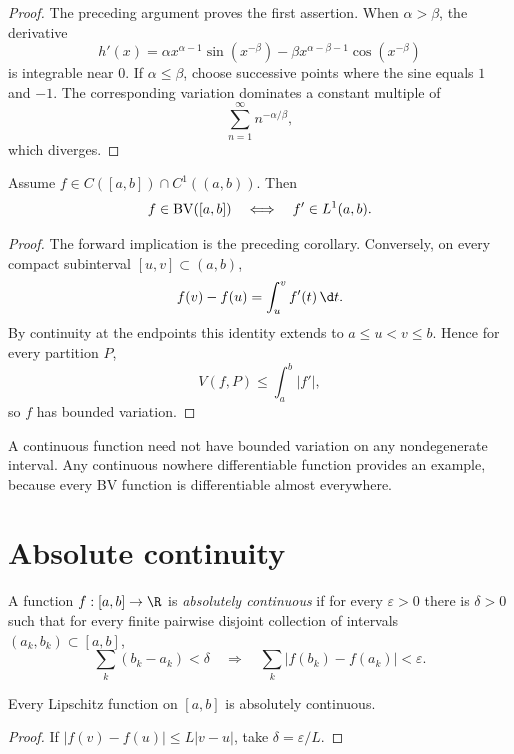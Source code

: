 \begin{proof}
The preceding argument proves the first assertion. When $\alpha>\beta$, the derivative
\[
h'(x)=\alpha x^{\alpha-1}\sin(x^{-\beta})
      -\beta x^{\alpha-\beta-1}\cos(x^{-\beta})
\]
is integrable near $0$. If $\alpha\leq\beta$, choose successive points where the sine equals $1$ and $-1$. The corresponding variation dominates a constant multiple of
\[
\sum_{n=1}^{\infty}n^{-\alpha/\beta},
\]
which diverges.
\end{proof}

\begin{prop}
Assume $f\in C([a,b])\cap C^1((a,b))$. Then
\[
f\in\operatorname{BV}([a,b])\quad\Longleftrightarrow\quad f'\in L^1(a,b).
\]
\end{prop}

\begin{proof}
The forward implication is the preceding corollary. Conversely, on every compact subinterval $[u,v]\subset(a,b)$,
\[
f(v)-f(u)=\int_u^v f'(t)\,\d t.
\]
By continuity at the endpoints this identity extends to $a\leq u<v\leq b$. Hence for every partition $P$,
\[
V(f,P)\leq\int_a^b|f'|,
\]
so $f$ has bounded variation.
\end{proof}

\begin{remark}
A continuous function need not have bounded variation on any nondegenerate interval. Any continuous nowhere differentiable function provides an example, because every BV function is differentiable almost everywhere.
\end{remark}

\section{Absolute continuity}

\begin{de}
A function $f:[a,b]\to\R$ is \emph{absolutely continuous} if for every $\varepsilon>0$ there is $\delta>0$ such that for every finite pairwise disjoint collection of intervals $(a_k,b_k)\subset[a,b]$,
\[
\sum_k(b_k-a_k)<\delta
\quad\Longrightarrow\quad
\sum_k|f(b_k)-f(a_k)|<\varepsilon.
\]
\end{de}

\begin{prop}
Every Lipschitz function on $[a,b]$ is absolutely continuous.
\end{prop}

\begin{proof}
If $|f(v)-f(u)|\leq L|v-u|$, take $\delta=\varepsilon/L$.
\end{proof}

